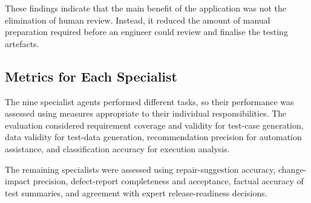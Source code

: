 These findings indicate that the main benefit of the application was not the elimination of human review. Instead, it reduced the amount of manual preparation required before an engineer could review and finalise the testing artefacts.

\subsection{Metrics for Each Specialist}
The nine specialist agents performed different tasks, so their performance was assessed using measures appropriate to their individual responsibilities. The evaluation considered requirement coverage and validity for test-case generation, data validity for test-data generation, recommendation precision for automation assistance, and classification accuracy for execution analysis.

The remaining specialists were assessed using repair-suggestion accuracy, change-impact precision, defect-report completeness and acceptance, factual accuracy of test summaries, and agreement with expert release-readiness decisions.

